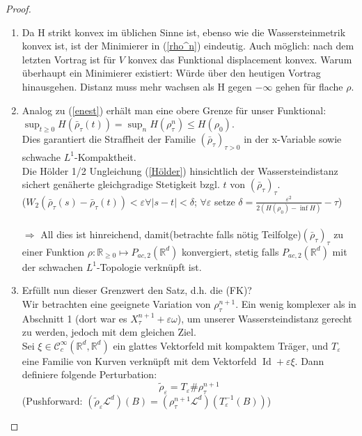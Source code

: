 \documentclass[11pt,a4paper,notitlepage]{scrreprt}
\newcommand{\RR}{\mathbb{R}}
\begin{document}
\begin{proof}
\begin{enumerate}
\item Da H strikt konvex im üblichen Sinne ist, ebenso wie die Wassersteinmetrik konvex ist, ist der Minimierer in (\ref{rho^n})  eindeutig. Auch möglich: nach dem letzten Vortrag ist für $V$ konvex das Funktional displacement konvex. Warum überhaupt ein Minimierer existiert: Würde über den heutigen Vortrag hinausgehen. Distanz muss mehr wachsen als H gegen $-\infty$ gehen für flache $\rho$.
\item Analog zu (\ref{enest}) erhält man eine obere Grenze für unser Funktional:\\ ${\sup_{t\geq 0} H(\bar{\rho}_\tau(t))=\sup_n H(\rho_\tau^n)\leq H(\rho_0)}$.\\
Dies garantiert die Straffheit der Familie $(\bar{\rho}_\tau)_{\tau >0}$ in der x-Variable sowie schwache $L^1$-Kompaktheit.\\
Die Hölder 1/2 Ungleichung (\ref{Hölder}) hinsichtlich der Wassersteindistanz sichert genäherte gleichgradige Stetigkeit bzgl. $t$ von $(\bar{\rho}_\tau)_\tau$.\\ ($W_2(\bar{\rho}_\tau(s)-\bar{\rho}_\tau(t))<\varepsilon \forall \vert s-t\vert<\delta$; $\forall \varepsilon$ setze $\delta=\frac{\varepsilon^2}{2(H(\rho_0)-\inf H)}-\tau$)\\\\
$\Rightarrow$ All dies ist hinreichend, damit(betrachte falls nötig Teilfolge)$(\bar{\rho}_\tau)_\tau$ zu einer Funktion $\rho: \RR_{\geq0} \mapsto P_{ac,2}(\RR^d)$ konvergiert, stetig falls $P_{ac,2}(\RR^d)$ mit der schwachen $L^1$-Topologie verknüpft ist. \\
\item Erfüllt nun dieser Grenzwert den Satz, d.h. die (FK)? \\
Wir betrachten eine geeignete Variation von $\rho_\tau^{n+1}$. Ein wenig komplexer als in Abschnitt 1 (dort war es $X_\tau^{n+1}+\varepsilon\omega$), um unserer Wassersteindistanz gerecht zu werden, jedoch mit dem gleichen Ziel.\\
Sei $\xi\in\mathcal{C}_c^\infty(\RR^d,\RR^d)$ ein glattes Vektorfeld mit kompaktem Träger, und $T_\varepsilon$ eine Familie von Kurven verknüpft mit dem Vektorfeld $\operatorname{Id} +\varepsilon\xi$. Dann definiere folgende Perturbation:
\[\tilde{\rho}_\varepsilon=T_\varepsilon \#\rho_\tau^{n+1} \]
(Pushforward: $(\tilde{\rho}_\varepsilon \mathcal{L}^d)(B)=(\rho_\tau^{n+1}\mathcal{L}^d)(T_\varepsilon^{-1}(B))$)\\

\end{enumerate}
\end{proof}
\end{document}
